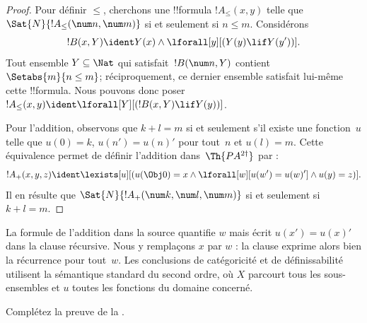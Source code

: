 \documentclass[../../../include/open-logic-section]{subfiles}
\begin{document}
\begin{proof}
Pour définir $\le$, cherchons une !!{formula}
$!A_\le(x,y)$ telle que
$\Sat{N}{!A_\le(\num n,\num m)}$ si et seulement
si $n\le m$. Considérons
\[
!B(x,Y) \ident Y(x) \land \lforall[y][(Y(y) \lif Y(y'))].
\]
Tout ensemble $Y\subseteq\Nat$ qui satisfait~$!B(\num n,Y)$
contient $\Setabs{m}{n\le m}$; réciproquement,
ce dernier ensemble satisfait lui-même cette !!{formula}.
Nous pouvons donc poser
$!A_\le(x,y)\ident
\lforall[Y][(!B(x,Y)\lif Y(y))]$.

Pour l'addition, observons que $k+l=m$ si et
seulement s'il existe une fonction~$u$ telle que
$u(0)=k$, $u(n')=u(n)'$ pour tout~$n$ et
$u(l)=m$. Cette équivalence permet de définir
l'addition dans~$\Th{PA^{2\dagger}}$ par :
\[
!A_+(x,y,z) \ident \lexists[u][(u(\Obj 0)=x \land
\lforall[w][u(w')=u(w)'] \land u(y)=z)].
\]
Il en résulte que
$\Sat{N}{!A_+(\num k,\num l,\num m)}$
si et seulement si $k+l=m$.
\end{proof}

\begin{editorial}
La formule de l'addition dans la source quantifie
$w$ mais écrit $u(x')=u(x)'$ dans la clause
récursive. Nous y remplaçons $x$ par $w$ : la
clause exprime alors bien la récurrence pour
tout~$w$. Les conclusions de catégoricité et
de définissabilité utilisent la sémantique
standard du second ordre, où $X$ parcourt tous
les sous-ensembles et $u$ toutes les fonctions
du domaine concerné.
\end{editorial}

\begin{prob}
Complétez la preuve de la
.
\end{prob}
\end{document}
